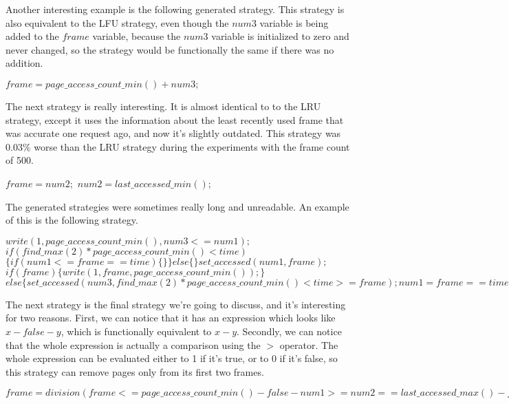 \medskip

Another interesting example is the following generated strategy. This strategy is also equivalent to the LFU strategy, even though the $num3$ variable is being added to the $frame$ variable, because the $num3$ variable is initialized to zero and never changed, so the strategy would be functionally the same if there was no addition.
\noindent
\begin{algorithmic}
\State $ frame=page\_access\_count\_min()+num3;$
\end{algorithmic}

\newpage

The next strategy is really interesting. It is almost identical to to the LRU strategy, except it uses the information about the least recently used frame that was accurate one request ago, and now it's slightly outdated. This strategy was 0.03\% worse than the LRU strategy during the experiments with the frame count of 500.
\noindent
\begin{algorithmic}
\State $ frame=num2;$
\State $ num2=last\_accessed\_min();$
\end{algorithmic}

\medskip

The generated strategies were sometimes really long and unreadable. An example of this is the following strategy.
\noindent
\begin{algorithmic}
\State $ write(1,page\_access\_count\_min(),num3<=num1);$
\State $ if(find\_max(2)*page\_access\_count\_min()<time)$
\State $\{if(num1<=frame==time)\{\}\}else\{\} set\_accessed(num1,frame);$ \State $if(frame)
\{write(1,frame,page\_access\_count\_min());\}$
\State $else\{set\_accessed(num3,find\_max(2) * page\_access\_count\_min()<time>=frame);num1=frame==time;\}$
\end{algorithmic}

\medskip

The next strategy is the final strategy we're going to discuss, and it's interesting for two reasons. First, we can notice that it has an expression which looks like $x - false - y$, which is functionally equivalent to $x - y$. Secondly, we can notice that the whole expression is actually a comparison using the $>$ operator. The whole expression can be evaluated either to 1 if it's true, or to 0 if it's false, so this strategy can remove pages only from its first two frames.
\noindent
\begin{algorithmic}
\State $ frame=division(frame<=page\_access\_count\_min()-false-num1>=num2==last\_accessed\_max()-frame>frame>=frame,time)>page\_access\_count\_min();$\end{algorithmic}

